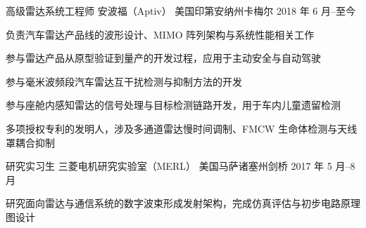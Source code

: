 %
%


\begin{cventries}

    \cventry
        {高级雷达系统工程师}
        {安波福（Aptiv）}
        {美国印第安纳州卡梅尔}
        {2018 年 6 月--至今}
        {
            \begin{cvitems}
                \item {负责汽车雷达产品线的波形设计、MIMO 阵列架构与系统性能相关工作}
                \item {参与雷达产品从原型验证到量产的开发过程，应用于主动安全与自动驾驶}
                \item {参与毫米波频段汽车雷达互干扰检测与抑制方法的开发}
                \item {参与座舱内感知雷达的信号处理与目标检测链路开发，用于车内儿童遗留检测}
                \item {多项授权专利的发明人，涉及多通道雷达慢时间调制、FMCW 生命体检测与天线罩耦合抑制}
            \end{cvitems}
        }

    \cventry
        {研究实习生}
        {三菱电机研究实验室（MERL）}
        {美国马萨诸塞州剑桥}
        {2017 年 5 月--8 月}
        {
            \begin{cvitems}
                \item {研究面向雷达与通信系统的数字波束形成发射架构，完成仿真评估与初步电路原理图设计}
            \end{cvitems}
        }

\end{cventries}
